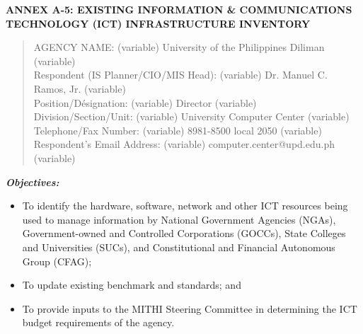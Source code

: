 \documentclass[a4paper,10pt, total={10.95in, 8in}]{article} %
\newcommand\tab[1][0.30cm]{\hspace*{#1}}
\begin{document}

\begin{center}
\textsc{\large \textbf{ANNEX A-5: EXISTING INFORMATION \& COMMUNICATIONS}}\\[0.15cm]
\textsc{\large \textbf{TECHNOLOGY (ICT) INFRASTRUCTURE INVENTORY}}
\end{center}
\vspace{1em}

\begin{quote}
\begin{mdframed}
{\selectfont

AGENCY NAME: (variable) University of the Philippines Diliman (variable) \\
Respondent (IS Planner/CIO/MIS Head)\footnotemark[1]: (variable) Dr. Manuel C. Ramos, Jr. (variable) \\
Position/D\'esignation: (variable) Director (variable) \\
Division/Section/Unit: (variable) University Computer Center (variable) \\
Telephone/Fax Number: (variable) 8981-8500 local 2050 (variable) \\
Respondent’s Email Address: (variable) computer.center@upd.edu.ph (variable)

}
\end{mdframed}
\end{quote}

\textbf{\textit{Objectives:}}
\begin{itemize}[left=3.5em]
\item \tab To identify the hardware, software, network and other ICT resources being used to manage information by National Government Agencies (NGAs), Government-owned and Controlled Corporations (GOCCs), State Colleges and Universities (SUCs), and Constitutional and Financial Autonomous Group (CFAG);
\item \tab To update existing benchmark and standards; and
\item \tab To provide inputs to the MITHI Steering Committee in determining the ICT budget requirements of the agency.
\end{itemize}
\end{document}
